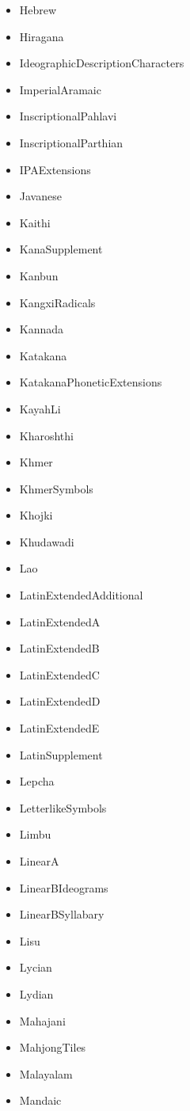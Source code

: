 ﻿\documentclass{article}
\newenvironment{itemlist}{%
  \begin{itemize}
	\setlength{\itemsep}{0pt}
	\setlength{\parsep}{0pt}
	\setlength{\topsep}{0pt}
	\setlength{\partopsep}{0pt}
	\setlength{\parskip}{0pt}
	\setlength{\labelsep}{5pt}}%
{
  \end{itemize}}
\begin{document}
\begin{multicols}{2}
\begin{itemlist}
				\item Hebrew
				\item Hiragana
				\item IdeographicDescriptionCharacters
				\item ImperialAramaic
				\item InscriptionalPahlavi
				\item InscriptionalParthian
				\item IPAExtensions
				\item Javanese
				\item Kaithi
				\item KanaSupplement
				\item Kanbun
				\item KangxiRadicals
				\item Kannada
				\item Katakana
				\item KatakanaPhoneticExtensions
				\item KayahLi
				\item Kharoshthi
				\item Khmer
				\item KhmerSymbols
				\item Khojki
				\item Khudawadi
				\item Lao
				\item LatinExtendedAdditional
				\item LatinExtendedA
				\item LatinExtendedB
				\item LatinExtendedC
				\item LatinExtendedD
				\item LatinExtendedE
				\item LatinSupplement
				\item Lepcha
				\item LetterlikeSymbols
				\item Limbu
				\item LinearA
				\item LinearBIdeograms
				\item LinearBSyllabary
				\item Lisu
				\item Lycian
				\item Lydian
				\item Mahajani
				\item MahjongTiles
				\item Malayalam
				\item Mandaic

\end{itemlist}
\end{multicols}
\end{document}
